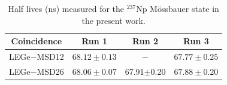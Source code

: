 \documentclass[aps,UTF8,prc,twocolumn,preprintnumbers,amsmath,amssymb,floatfix]{revtex4-2}
\begin{document}
\begin{table}[htbp!]
\caption{\label{Results} Half lives (ns) measured for the $^{237}$Np M\"{o}ssbauer state in the present work.}
\begin{center}
\renewcommand{\arraystretch}{1.1}  %
\begin{ruledtabular}
\begin{tabular}{cccc}
Coincidence  & Run 1  & Run 2  & Run 3\\
\hline
LEGe$-$MSD12 & $68.12\pm0.13$ & $-$ & $67.77\pm0.25$ \\
LEGe$-$MSD26 & $68.06\pm0.07$ & 67.91$\pm$0.20 & $67.88\pm0.20$ \\
\end{tabular}
\end{ruledtabular}
\end{center}
\end{table}
\end{document}
